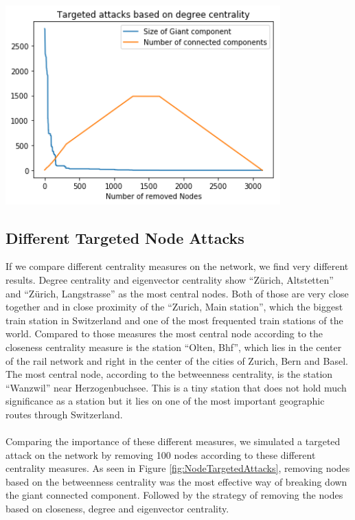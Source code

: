 \documentclass{Resources/netsci-project}
\begin{document}
\begin{center}
    \centering
    \includegraphics[width=300pt]{Resources/node_targeted_degree_attacks}
    \label{fig:NodeTargetedDegreeAttacks}
\end{center}


\subsection{Different Targeted Node Attacks}
If we compare different centrality measures on the network, we find very different results. Degree centrality and eigenvector centrality show “Zürich, Altstetten” and “Zürich, Langstrasse” as the most central nodes. Both of those are very close together and in close proximity of the “Zurich, Main station”, which the biggest train station in Switzerland and one of the most frequented train stations of the world. Compared to those measures the most central node according to the closeness centrality measure is the station “Olten, Bhf”, which lies in the center of the rail network and right in the center of the cities of Zurich, Bern and Basel. The most central node, according to the betweenness centrality, is the station “Wanzwil” near Herzogenbuchsee. This is a tiny station that does not hold much significance as a station but it lies on one of the most important geographic routes through Switzerland.
\\~\\
Comparing the importance of these different measures, we simulated a targeted attack on the network by removing 100 nodes according to these different centrality measures. As seen in Figure \ref{fig:NodeTargetedAttacks}, removing nodes based on the betweenness centrality was the most effective way of breaking down the giant connected component. Followed by the strategy of removing the nodes based on closeness, degree and eigenvector centrality.
\end{document}
